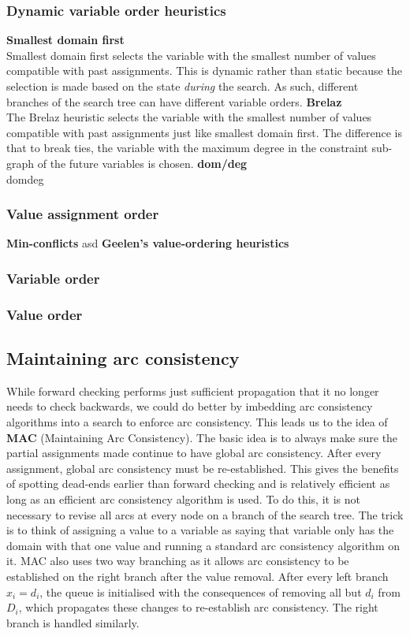 \documentclass[CS4402-Notes.tex]{subfiles}
\begin{document}
\subsubsection{Dynamic variable order heuristics}
\textbf{Smallest domain first} \\
Smallest domain first selects the variable with the smallest number of values compatible with past assignments. This is dynamic rather than static because the selection is made based on the state \textit{during} the search. As such, different branches of the search tree can have different variable orders. 
\n
\textbf{Brelaz} \\
The Brelaz heuristic selects the variable with the smallest number of values compatible with past assignments just like smallest domain first. The difference is that to break ties, the variable with the maximum degree in the constraint sub-graph of the future variables is chosen. 
\n
\textbf{dom/deg} \\
domdeg

\subsubsection{Value assignment order}
\textbf{Min-conflicts}
asd
\n
\textbf{Geelen's value-ordering heuristics}
\subsubsection{Variable order}

\subsubsection{Value order}

\subsection{Maintaining arc consistency}
While forward checking performs just sufficient propagation that it no longer needs to check backwards, we could do better by imbedding arc consistency algorithms into a search to enforce arc consistency. This leads us to the idea of \textbf{MAC} (Maintaining Arc Consistency).
\n
The basic idea is to always make sure the partial assignments made continue to have global arc consistency. After every assignment, global arc consistency must be re-established. This gives the benefits of spotting dead-ends earlier than forward checking and is relatively efficient as long as an efficient arc consistency algorithm is used.
\n
To do this, it is not necessary to revise all arcs at every node on a branch of the search tree. The trick is to think of assigning a value to a variable as saying that variable only has the domain with that one value and running a standard arc consistency algorithm on it. MAC also uses two way branching as it allows arc consistency to be established on the right branch after the value removal. After every left branch $x_i = d_i$, the queue is initialised with the consequences of removing all but $d_i$ from $D_i$, which propagates these changes to re-establish arc consistency. The right branch is handled similarly. 
\end{document}
